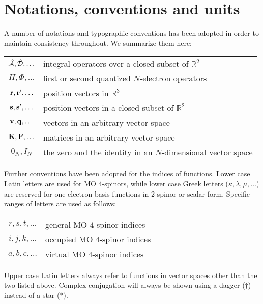 \chapter*{Notations, conventions and units}

A number of notations and typographic conventions has been adopted in
order to maintain consistency throughout. We summarize them here:
\begin{table*}[!h]
\begin{tabular}{c l}
 $\hat{\mathcal{A}}, \hat{\mathcal{D}}, \ldots$ & integral operators over a closed subset of $\mathbb{R}^2$ \\
 $H, \varPhi, \ldots$ & first or second quantized $N$-electron operators \\
 $\mathbf{r}, \mathbf{r}^\prime, \ldots$ & position vectors in $\mathbb{R}^3$ \\
 $\mathbf{s}, \mathbf{s}^\prime, \ldots$ & position vectors in a closed subset of $\mathbb{R}^2$ \\
 $\mathbf{v}, \mathbf{q}, \ldots$ & vectors in an arbitrary vector space \\
 $\mathbf{K}, \mathbf{F}, \ldots$ & matrices in an arbitrary vector space \\
 $0_N, I_N$ & the zero and the identity in an $N$-dimensional vector space
\end{tabular}
\end{table*}

Further conventions have been adopted for the indices of functions.
Lower case Latin letters are used for \ac{MO} 4-spinors, while lower case
Greek letters ($\kappa, \lambda, \mu, \ldots$) are reserved for
one-electron basis functions in 2-spinor or scalar form.
Specific ranges of letters are used as follows:
\begin{table*}[!h]
\begin{tabular}{c l}
 $r, s, t, \ldots$ & general MO 4-spinor indices \\
 $i, j, k, \ldots$ & occupied MO 4-spinor indices \\
 $a, b, c, \ldots$ & virtual MO 4-spinor indices
\end{tabular}
\end{table*}

Upper case Latin letters always refer to functions in vector spaces
other than the two listed above. Complex conjugation will always be
shown using a dagger ($\dagger$) instead of a star ($*$).

